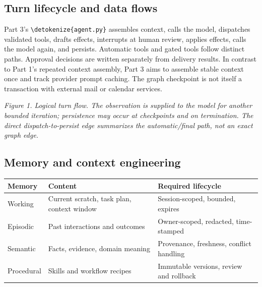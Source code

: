 \documentclass[11pt,letterpaper]{article}
\newcommand{\src}[1]{\expandafter\nolinkurl\expandafter{\detokenize{#1}}}
\begin{document}
\subsection{Turn lifecycle and data flows}
Part 3's \src{agent.py} assembles context, calls the model, dispatches validated tools, drafts effects, interrupts at human review, applies effects, calls the model again, and persists. Automatic tools and gated tools follow distinct paths. Approval decisions are written separately from delivery results. In contrast to Part 1's repeated context assembly, Part 3 aims to assemble stable context once and track provider prompt caching. The graph checkpoint is not itself a transaction with external mail or calendar services.
\begin{center}\end{center}
\textit{Figure 1. Logical turn flow. The observation is supplied to the model for another bounded iteration; persistence may occur at checkpoints and on termination. The direct dispatch-to-persist edge summarizes the automatic/final path, not an exact graph edge.}
\subsection{Memory and context engineering}
\begin{tabularx}{\linewidth}{p{.23\linewidth}YY}\toprule
Memory & Content & Required lifecycle \\\midrule
Working & Current scratch, task plan, context window & Session-scoped, bounded, expires \\
Episodic & Past interactions and outcomes & Owner-scoped, redacted, time-stamped \\
Semantic & Facts, evidence, domain meaning & Provenance, freshness, conflict handling \\
Procedural & Skills and workflow recipes & Immutable versions, review and rollback \\
\bottomrule\end{tabularx}
\end{document}
